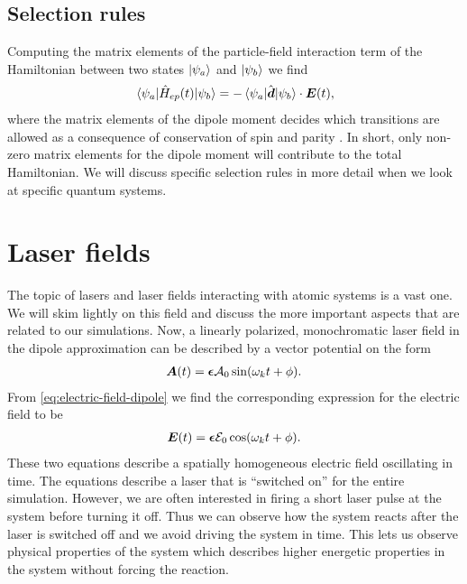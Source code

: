         \subsection{Selection rules}
            Computing the matrix elements of the particle-field interaction term
            of the Hamiltonian between two states $\ket{\psi_{a}}$ and
            $\ket{\psi_{b}}$ we find
            \begin{align}
                \mel{\psi_{a}}{\hat{H}_{ep}(t)}{\psi_{b}}
                =
                - \mel{\psi_{a}}{\hat{\boldsymbol{d}}}{\psi_b}
                \cdot \boldsymbol{E}(t),
            \end{align}
            where the matrix elements of the dipole moment decides which
            transitions are allowed as a consequence of conservation of spin and
            parity \cite{modern-qm}.
            In short, only non-zero matrix elements for the dipole moment will
            contribute to the total Hamiltonian.
            We will discuss specific selection rules in more detail when we look
            at specific quantum systems.

    \section{Laser fields}
        The topic of lasers and laser fields interacting with atomic systems is
        a vast one.
        We will skim lightly on this field and discuss the more important
        aspects that are related to our simulations.
        Now, a linearly polarized, monochromatic laser field in the dipole
        approximation can be described by a vector potential on the form
        \cite{joachain2012atoms}
        \begin{align}
            \boldsymbol{A}(t) = \boldsymbol{\epsilon}\mathcal{A}_0
            \sin(\omega_k t + \phi). \\
        \end{align}
        From \autoref{eq:electric-field-dipole} we find the corresponding
        expression for the electric field to be
        \begin{align}
            \boldsymbol{E}(t) = \boldsymbol{\epsilon} \mathcal{E}_0
            \cos(\omega_k t + \phi).
        \end{align}
        These two equations describe a spatially homogeneous electric field
        oscillating in time.
        The equations describe a laser that is ``switched on'' for the entire
        simulation.
        However, we are often interested in firing a short laser pulse at the
        system before turning it off.
        Thus we can observe how the system reacts after the laser is switched
        off and we avoid driving the system in time.
        This lets us observe physical properties of the system which describes
        higher energetic properties in the system without forcing the reaction.

